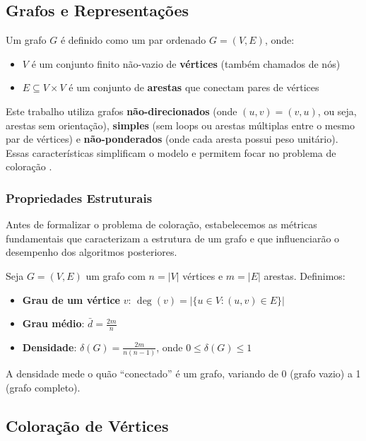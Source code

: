 \documentclass[12pt]{article}
\begin{document}
\subsection{Grafos e Representações}

Um grafo $G$ é definido como um par ordenado $G = (V, E)$, onde:
\begin{itemize}
    \item $V$ é um conjunto finito não-vazio de \textbf{vértices} (também chamados de nós)
    \item $E \subseteq V \times V$ é um conjunto de \textbf{arestas} que conectam pares de vértices
\end{itemize}

\noindent Este trabalho utiliza grafos \textbf{não-direcionados} (onde $(u,v) = (v,u)$, ou seja, arestas sem orientação), \textbf{simples} (sem loops ou arestas múltiplas entre o mesmo par de vértices) e \textbf{não-ponderados} (onde cada aresta possui peso unitário). Essas características simplificam o modelo e permitem focar no problema de coloração \cite{boaventura2002grafos}.

\subsubsection{Propriedades Estruturais}

Antes de formalizar o problema de coloração, estabelecemos as métricas fundamentais que caracterizam a estrutura de um grafo e que influenciarão o desempenho dos algoritmos posteriores.

Seja $G = (V, E)$ um grafo com $n = |V|$ vértices e $m = |E|$ arestas. Definimos:

\begin{itemize}
    \item \textbf{Grau de um vértice} $v$: $\deg(v) = |\{u \in V : (u,v) \in E\}|$
    \item \textbf{Grau médio}: $\bar{d} = \frac{2m}{n}$
    \item \textbf{Densidade}: $\delta(G) = \frac{2m}{n(n-1)}$, onde $0 \leq \delta(G) \leq 1$
\end{itemize}

A densidade mede o quão ``conectado'' é um grafo, variando de 0 (grafo vazio) a 1 (grafo completo).

\subsection{Coloração de Vértices}
\end{document}
